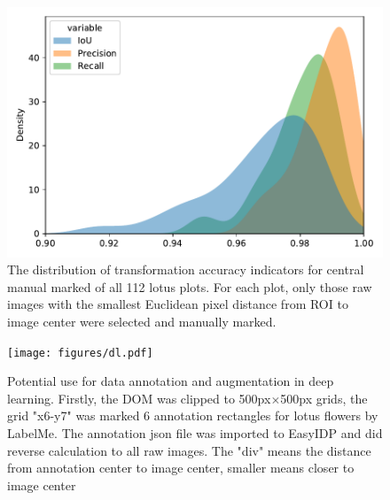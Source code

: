 \documentclass[doublespacing]{configs/bmcart}
\begin{document}
\begin{backmatter}
\begin{figure}[!htb]
  \includegraphics[width=0.95\linewidth]{figures/iou_all.pdf}
  \caption{The distribution of transformation accuracy indicators for central manual marked of all 112 lotus plots. For each plot, only those raw images with the smallest Euclidean pixel distance from ROI to image center were selected and manually marked.}
  \label{fig:iou_all}
\end{figure}

\begin{figure}[!htb]
  \texttt{[image: figures/dl.pdf]}
  \caption{Potential use for data annotation and augmentation in deep learning. Firstly, the DOM was clipped to 500px$\times$500px grids, the grid "x6-y7" was marked 6 annotation rectangles for lotus flowers by LabelMe. The annotation json file was imported to EasyIDP and did reverse calculation to all raw images. The "div" means the distance from annotation center to image center, smaller means closer to image center}
  \label{fig:dl}
\end{figure}

\end{backmatter}
\end{document}
